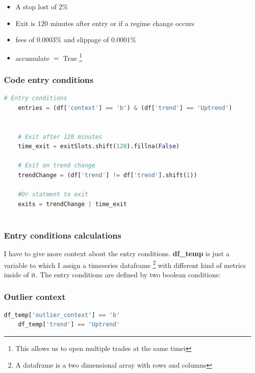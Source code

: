\documentclass[12pt]{article}
\begin{document}
\begin{itemize}
    \item A stop lost of $2\%$
    \item Exit is 120 minutes after entry or if a regime change occurs
    \item fees of $0.0003\%$ and slippage of $0.0001\%$
    \item accumulate $=$ True \footnote{This allows us to open multiple trades at the same timei}
\end{itemize}

\newpage
\subsubsection*{Code entry conditions}

\begin{lstlisting}[language=Python]
    # Entry conditions
    entries = (df['context'] == 'b') & (df['trend'] == 'Uptrend')
    
    
    # Exit after 120 minutes
    time_exit = exitSlots.shift(120).fillna(False)
    
    # Exit on trend change
    trendChange = (df['trend'] != df['trend'].shift(1))
    
    #Or statment to exit
    exits = trendChange | time_exit
    

\end{lstlisting}





\newpage
\subsubsection*{Entry conditions calculations}
I have to give more context about the entry conditions. \textbf{df\_temp} is just a variable to which I assign a timeseries dataframe \footnote{A dataframe is a two dimensional array with rows and columns} with different kind of metrics inside of it. The entry conditions are defined by two boolean conditions:


\subsubsection*{Outlier context}


\begin{lstlisting}[language=Python]
    df_temp['outlier_context'] == 'b'
    df_temp['trend'] == 'Uptrend'
\end{lstlisting}
\end{document}
